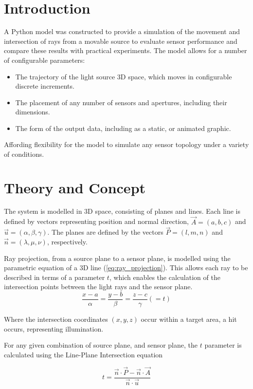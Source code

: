 \section{Introduction}
A Python model was constructed to provide a simulation of the movement and intersection of rays from a movable source to evaluate sensor performance and compare these results with practical experiments.
The model allows for a number of configurable parameters:
\begin{itemize}
    \item The trajectory of the light source 3D space, which moves in configurable discrete increments.
    \item The placement of any number of sensors and apertures, including their dimensions.
    \item The form of the output data, including as a static, or animated graphic.
\end{itemize}
Affording flexibility for the model to simulate any sensor topology under a variety of conditions.

\section{Theory and Concept}
The system is modelled in 3D space, consisting of planes and lines. 
Each line is defined by vectors representing position and normal direction, $ \vec{A} = (a,b,c)$ and $ \vec{u} = (\alpha, \beta, \gamma)$.
The planes are defined by the vectors $\vec{P} = (l,m,n) $ and $ \vec{n} = (\lambda, \mu, \nu)$, respectively.

Ray projection, from a source plane to a sensor plane, is modelled using the parametric equation of a 3D line (\ref{eq:ray_projection}). This allows each ray to be described in terms of a parameter $t$, which enables the calculation of the intersection points between the light rays and the sensor plane. 
\begin{equation}
\frac{x - a}{\alpha} = \frac{y - b}{\beta} = \frac{z - c}{\gamma} (=t)
\label{eq:ray_projection}
\end{equation}

Where the intersection coordinates $(x,y,z)$ occur within a target area, a hit occurs, representing illumination.

For any given combination of source plane, and sensor plane, the $t$ parameter is calculated using the Line-Plane Intersection equation

\begin{equation}
    t = \frac{\vec{n} \cdot \vec{P} - \vec{n} \cdot \vec{A}}{\vec{n} \cdot \vec{u}}
    \label{Line-Plane Intersection}
\end{equation}